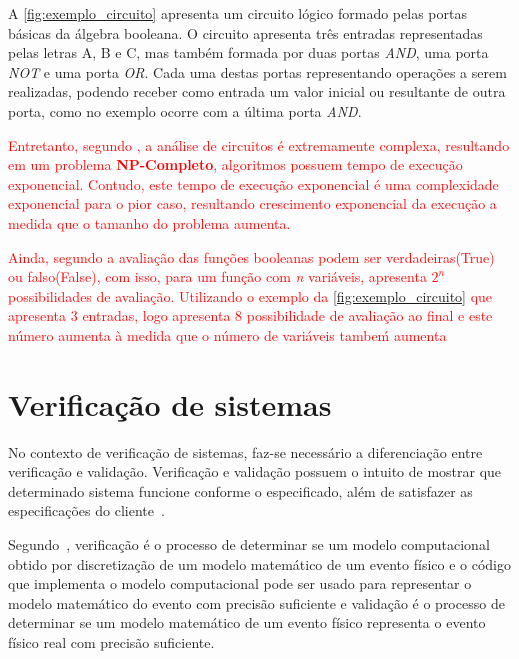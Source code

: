 A \autoref{fig:exemplo_circuito} apresenta um circuito lógico formado pelas portas básicas da álgebra booleana. O circuito apresenta três entradas representadas pelas letras A, B e C, mas também formada por duas portas \textit{AND}, uma porta \textit{NOT} e uma porta \textit{OR}. Cada uma destas portas representando operações a serem realizadas, podendo receber como entrada um valor inicial ou resultante de outra porta, como no exemplo ocorre com a última porta \textit{AND}.

\par
\textcolor{red}{Entretanto, segundo , a análise de circuitos é extremamente complexa, resultando em um problema \textbf{NP-Completo}, algoritmos possuem tempo de execução exponencial. Contudo, este tempo de execução exponencial é uma complexidade exponencial para o pior caso, resultando crescimento exponencial da execução a medida que o tamanho do problema aumenta.}

\par
\textcolor{red}{Ainda, segundo  a avaliação das funções booleanas podem ser verdadeiras(True) ou falso(False), com isso, para um função com \textit{n} variáveis, apresenta $2^{n}$ possibilidades de avaliação. Utilizando o exemplo da \autoref{fig:exemplo_circuito} que apresenta 3 entradas, logo apresenta 8 possibilidade de avaliação ao final e este número aumenta à medida que o número de variáveis tambeḿ aumenta}

\section{Verificação de sistemas}
 No contexto de verificação de sistemas, faz-se necessário a diferenciação entre verificação e validação. Verificação e validação possuem o intuito de mostrar que determinado sistema funcione conforme o especificado, além de satisfazer as especificações do cliente~\cite{sommerville2011engenharia}. 

\par
Segundo~, verificação é o processo de determinar se um modelo computacional obtido por discretização de um modelo matemático de um evento físico e o código que implementa o modelo computacional pode ser usado para representar o modelo matemático do evento com precisão suficiente e validação é o processo de determinar se um modelo matemático de um evento físico representa o evento físico real com precisão suficiente.

